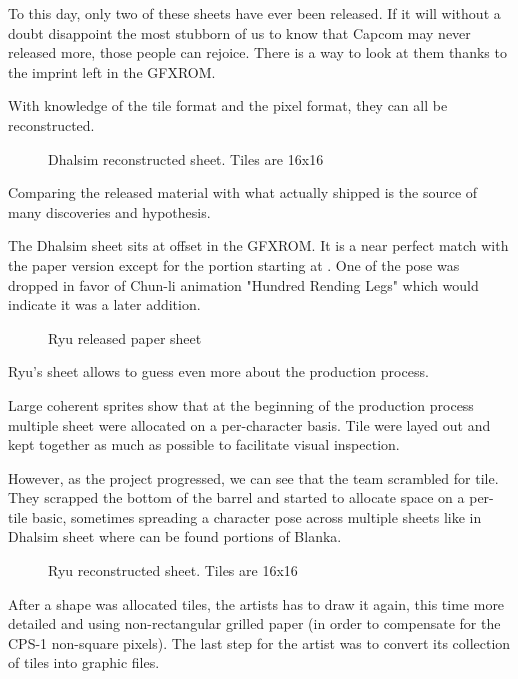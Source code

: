 To this day, only two of these sheets have ever been released\cite{ffdevinterview}\cite{htmcc}. If it will without a doubt disappoint the most stubborn of us to know that Capcom may never released more, those people can rejoice. There is a way to look at them thanks to the imprint left in the GFXROM. 

With knowledge of the tile format and the pixel format, they can all be reconstructed.




 \begin{figure}[H]
\caption*{Dhalsim reconstructed sheet. Tiles are 16x16}
\end{figure}

Comparing the released material with what actually shipped is the source of many discoveries and hypothesis. 


The Dhalsim sheet sits at offset  in the GFXROM. It is a near perfect match with the paper version except for the portion starting at . One of the pose was dropped in favor of Chun-li animation "Hundred Rending Legs" which would indicate it was a later addition. 

 \begin{figure}[H]
\caption*{Ryu released paper sheet}
\end{figure}

Ryu's sheet  allows to guess even more about the production process. 

Large coherent sprites show that at the beginning of the production process multiple sheet were allocated on a per-character basis. Tile were layed out and kept together as much as possible to facilitate visual inspection.

However, as the project progressed, we can see that the team scrambled for tile. They scrapped the bottom of the barrel and started to allocate space on a per-tile basic, sometimes spreading a character pose across multiple sheets like in Dhalsim sheet where can be found portions of Blanka.

 \begin{figure}[H]
\caption*{Ryu reconstructed sheet. Tiles are 16x16}
\end{figure}


After a shape was allocated tiles, the artists has to draw it again, this time more detailed and using non-rectangular grilled paper (in order to compensate for the CPS-1 non-square pixels). The last step for the artist was to convert its collection of tiles into graphic files. 

